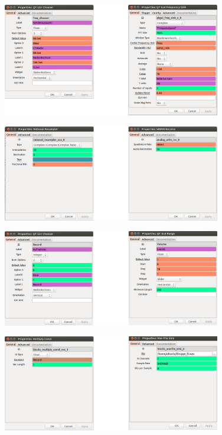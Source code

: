 \documentclass[12pt,a4paper]{article}
\begin{document}
\begin{figure}[hbt!]
\centering
	\includegraphics[width=0.85\textwidth ]{Bilder/Aufgabe1-properties2.png}
\end{figure}


\begin{figure}[hbt!]
\centering
	\includegraphics[width=0.85\textwidth ]{Bilder/Aufgabe1-properties3.png}
\end{figure}


\begin{figure}[hbt!]
\centering
	\includegraphics[width=0.85\textwidth ]{Bilder/Aufgabe1-properties4.png}
\end{figure}
\clearpage

\begin{figure}[hbt!]
\centering
	\includegraphics[width=0.85\textwidth ]{Bilder/Aufgabe1-properties5.png}
\end{figure}
\end{document}
